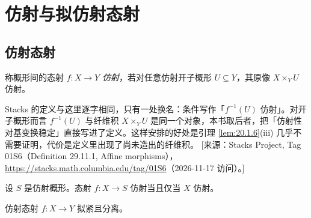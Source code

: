 
\providecommand{\fm}{\mathfrak{m}}

\makeatletter
{}
\makeatother

\section{仿射与拟仿射态射}\label{sec:20}

\subsection{仿射态射}\label{sec:20.1}

\begin{definition}\label{def:20.1.1}
称概形间的态射 $f:X\to Y$ \emph{仿射}，若对任意仿射开子概形 $U\subseteq Y$，其原像 $X\times_Y U$ 仿射。
\end{definition}

\begin{yizhu}
Stacks 的定义与这里逐字相同，只有一处换名：条件写作「$f^{-1}(U)$ 仿射」。对开子概形而言 $f^{-1}(U)$ 与纤维积 $X\times_Y U$ 是同一个对象，本书取后者，把「仿射性对基变换稳定」直接写进了定义。这样安排的好处是引理 \ref{lem:20.1.6}(iii) 几乎不需要证明，代价是定义里出现了尚未造出的纤维积。
[来源：Stacks Project, Tag 01S6（Definition 29.11.1, Affine morphisms），\url{https://stacks.math.columbia.edu/tag/01S6}（2026-11-17 访问）。]
\end{yizhu}

\begin{example}\label{ex:20.1.2}
设 $S$ 是仿射概形。态射 $f:X\to S$ 仿射当且仅当 $X$ 仿射。
\end{example}

\begin{lemma}\label{lem:20.1.3}
仿射态射 $f:X\to Y$ 拟紧且分离。
\end{lemma}

